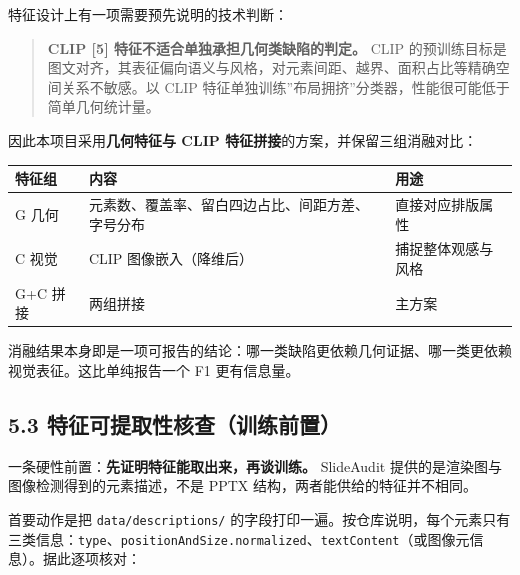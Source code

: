 \documentclass[
  11pt,
]{article}
\newcounter{none} %
\begin{document}
特征设计上有一项需要预先说明的技术判断：

\begin{quote}
\textbf{CLIP {[}5{]} 特征不适合单独承担几何类缺陷的判定。} CLIP
的预训练目标是图文对齐，其表征偏向语义与风格，对元素间距、越界、面积占比等精确空间关系不敏感。以
CLIP 特征单独训练''布局拥挤''分类器，性能很可能低于简单几何统计量。
\end{quote}

因此本项目采用\textbf{几何特征与 CLIP
特征拼接}的方案，并保留三组消融对比：

{\def\LTcaptype{none} %
\begin{longtable}[]{@{}
  >{\raggedright\arraybackslash}p{}
  >{\raggedright\arraybackslash}p{}
  >{\raggedright\arraybackslash}p{}@{}}
\toprule\noalign{}
\begin{minipage}[b]{\linewidth}\raggedright
特征组
\end{minipage} & \begin{minipage}[b]{\linewidth}\raggedright
内容
\end{minipage} & \begin{minipage}[b]{\linewidth}\raggedright
用途
\end{minipage} \\
\midrule\noalign{}
\endhead
\bottomrule\noalign{}
\endlastfoot
G 几何 & 元素数、覆盖率、留白四边占比、间距方差、字号分布 &
直接对应排版属性 \\
C 视觉 & CLIP 图像嵌入（降维后） & 捕捉整体观感与风格 \\
G+C 拼接 & 两组拼接 & 主方案 \\
\end{longtable}
}

消融结果本身即是一项可报告的结论：哪一类缺陷更依赖几何证据、哪一类更依赖视觉表征。这比单纯报告一个
F1 更有信息量。

\subsection{5.3
特征可提取性核查（训练前置）}\label{ux7279ux5f81ux53efux63d0ux53d6ux6027ux6838ux67e5ux8badux7ec3ux524dux7f6e}

一条硬性前置：\textbf{先证明特征能取出来，再谈训练。} SlideAudit
提供的是渲染图与图像检测得到的元素描述，不是 PPTX
结构，两者能供给的特征并不相同。

首要动作是把 \texttt{data/descriptions/}
的字段打印一遍。按仓库说明，每个元素只有三类信息：\texttt{type}、\texttt{positionAndSize.normalized}、\texttt{textContent}（或图像元信息）。据此逐项核对：
\end{document}
